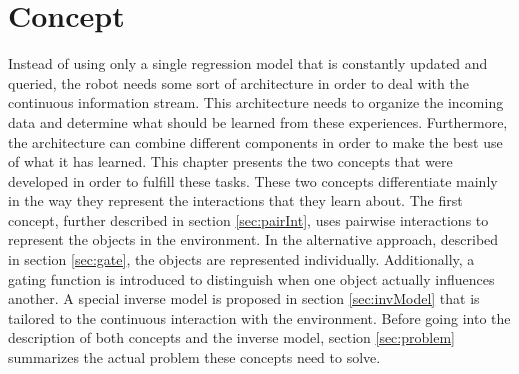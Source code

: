 \chapter{Concept \label{chap:concept}}



Instead of using only a single regression model that is constantly updated and queried, the robot needs some sort of architecture in order to deal with the continuous information stream. This architecture needs to organize the incoming data and determine what should be learned from these experiences. Furthermore, the architecture can combine different components in order to make the best use of what it has learned. 
This chapter presents the two concepts that were developed in order to fulfill these tasks. These two concepts differentiate mainly in the way they represent the interactions that they learn about. The first concept, further described in section \ref{sec:pairInt}, uses pairwise interactions to represent the objects in the environment. In the alternative approach, described in section \ref{sec:gate}, the objects are represented individually. Additionally, a gating function is introduced to distinguish when one object actually influences another. 
A special inverse model is proposed in section \ref{sec:invModel} that is tailored to the continuous interaction with the environment. %
Before going into the description of both concepts and the inverse model, section \ref{sec:problem} summarizes the actual problem these concepts need to solve. 

%

